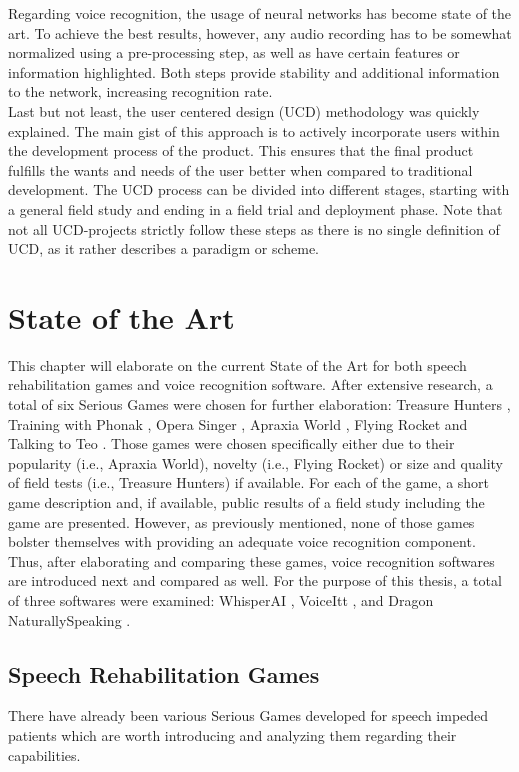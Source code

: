 \documentclass[draft,final]{vutinfth} %
\begin{document}
Regarding voice recognition, the usage of neural networks has become state of the art. To achieve the best results, however, any audio recording has to be somewhat normalized using a pre-processing step, as well as have certain features or information highlighted. Both steps provide stability and additional information to the network, increasing recognition rate. \\

Last but not least, the user centered design (UCD) methodology was quickly explained. The main gist of this approach is to actively incorporate users within the development process of the product. This  ensures that the final product fulfills the wants and needs of the user better when compared to traditional development. The UCD process can be divided into different stages, starting with a general field study and ending in a field trial and deployment phase. Note that not all UCD-projects strictly follow these steps as there is no single definition of UCD, as it rather describes a paradigm or scheme.


\chapter{State of the Art}
\label{chap:state}
This chapter will elaborate on the current State of the Art for both speech rehabilitation games and voice recognition software. After extensive research, a total of six Serious Games were chosen for further elaboration: Treasure Hunters \cite{TreasureHunters}, Training with Phonak \cite{Phonak}, Opera Singer \cite{ParkinsonGame}, Apraxia World \cite{hair2021longitudinal}, Flying Rocket \cite{takagi2020voice} and Talking to Teo \cite{navarro2014talking}. Those games were chosen specifically either due to their popularity (i.e., Apraxia World), novelty (i.e., Flying Rocket) or size and quality of field tests (i.e., Treasure Hunters) if available. For each of the game, a short game description and, if available, public results of a field study including the game are presented. However, as previously mentioned, none of those games bolster themselves with providing an adequate voice recognition component. Thus, after elaborating and comparing these games, voice recognition softwares are introduced next and compared as well. For the purpose of this thesis, a total of three softwares were examined: WhisperAI \cite{radford2023robust}, VoiceItt \cite{howarth2024developing}, and Dragon NaturallySpeaking \cite{mccrocklin2020revisiting} .
\section{Speech Rehabilitation Games}
There have already been various Serious Games developed for speech impeded patients which are worth introducing and analyzing them regarding their capabilities.
\end{document}
